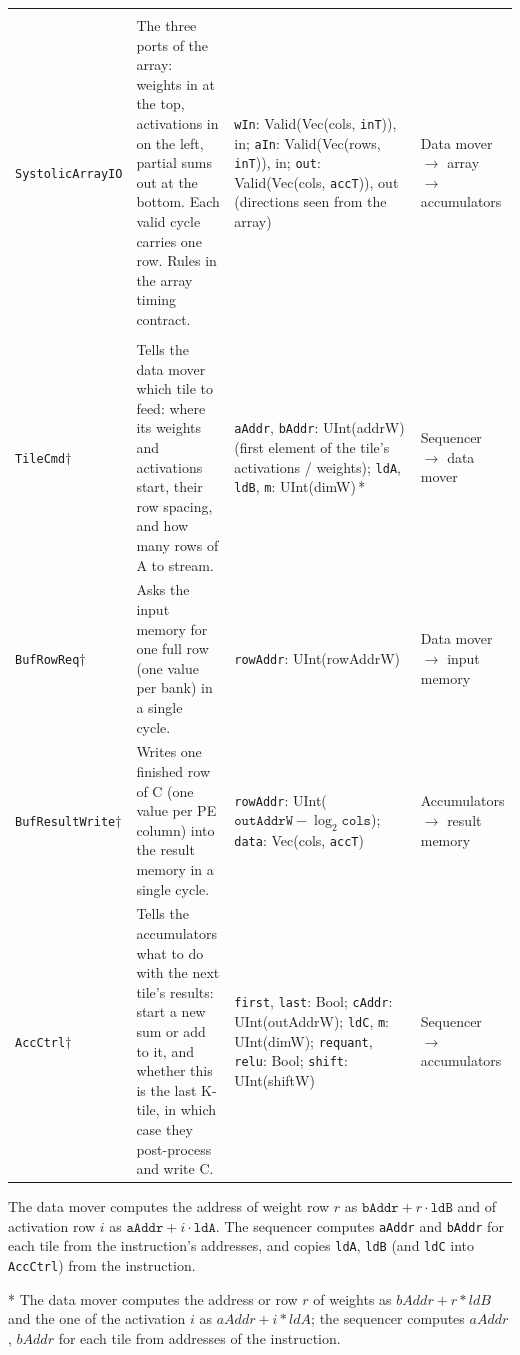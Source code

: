 \documentclass{article}
\begin{document}
\begin{landscape}
{\begin{xltabular}{\linewidth}{@{} >{\raggedright\arraybackslash}p{3.3cm} >{\raggedright\arraybackslash}p{6.2cm} Y >{\raggedright\arraybackslash}p{3.4cm} @{}}
   \\[2pt]
  \texttt{SystolicArrayIO}
    & The three ports of the array: weights in at the top, activations in on the left, partial sums out at the bottom. Each valid cycle carries one row. Rules in the array timing contract.
    & \texttt{wIn}: Valid(Vec(cols, \texttt{inT})), in; \texttt{aIn}: Valid(Vec(rows, \texttt{inT})), in;
      \texttt{out}: Valid(Vec(cols, \texttt{accT})), out (directions seen from the array)
    & Data mover $\rightarrow$ array $\rightarrow$ accumulators \\
  \midrule

   \\[2pt]
  \texttt{TileCmd}$\dagger$
    & Tells the data mover which tile to feed: where its weights and activations start, their row spacing, and how many rows of A to stream.
    & \texttt{aAddr}, \texttt{bAddr}: UInt(addrW) (first element of the tile's activations / weights); \texttt{ldA}, \texttt{ldB}, \texttt{m}: UInt(dimW)\,*
    & Sequencer $\rightarrow$ data mover \\
  \texttt{BufRowReq}$\dagger$
    & Asks the input memory for one full row (one value per bank) in a single cycle.
    & \texttt{rowAddr}: UInt(rowAddrW)
    & Data mover $\rightarrow$ input memory \\
  \texttt{BufResultWrite}$\dagger$
    & Writes one finished row of C (one value per PE column) into the result memory in a single cycle.
    & \texttt{rowAddr}: UInt($\texttt{outAddrW} - \log_2\texttt{cols}$); \texttt{data}: Vec(cols, \texttt{accT})
    & Accumulators $\rightarrow$ result memory \\
  \texttt{AccCtrl}$\dagger$
    & Tells the accumulators what to do with the next tile's results: start a new sum or add to it, and whether this is the last K-tile, in which case they post-process and write C.
    & \texttt{first}, \texttt{last}: Bool; \texttt{cAddr}: UInt(outAddrW); \texttt{ldC}, \texttt{m}: UInt(dimW); \texttt{requant}, \texttt{relu}: Bool;
      \texttt{shift}: UInt(shiftW)
    & Sequencer $\rightarrow$ accumulators \\
\end{xltabular}}

\noindent * The data mover computes the address of weight row $r$ as $\texttt{bAddr} + r\cdot\texttt{ldB}$ and of activation
row $i$ as $\texttt{aAddr} + i\cdot\texttt{ldA}$. The sequencer computes \texttt{aAddr} and \texttt{bAddr} for each tile from the
instruction's addresses, and copies \texttt{ldA}, \texttt{ldB} (and \texttt{ldC} into \texttt{AccCtrl}) from the instruction.
\end{landscape}

\vspace{0.7em}

* The data mover computes the address or row $r$ of weights as $bAddr + r*ldB$ and the one of the activation $i$ as $aAddr + i*ldA$; the sequencer computes $aAddr$, $bAddr$ for each tile from addresses of the instruction.
\end{document}
